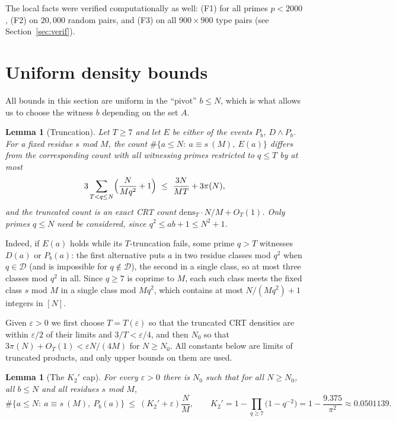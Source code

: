 \documentclass[11pt,a4paper]{article}
\theoremstyle{plain}
\newtheorem{lemma}[theorem]{Lemma}
\theoremstyle{definition}
\theoremstyle{remark}
\newcommand{\Dset}{\mathcal{D}}
\begin{document}
The local facts were verified computationally as well: (F1) for all primes $p<2000$, (F2) on $20{,}000$
random pairs, and (F3) on all $900\times 900$ type pairs (see Section~\ref{sec:verif}).

\section{Uniform density bounds}\label{sec:dens}

All bounds in this section are uniform in the ``pivot'' $b\le N$, which is what allows us to choose
the witness $b$ depending on the set $A$.

\begin{lemma}[Truncation]\label{lem:trunc}
Let $T\ge 7$ and let $E$ be either of the events $P_b$, $D\wedge P_b$. For a fixed residue $s$ mod $M$,
the count $\#\{a\le N:\ a\equiv s\ (M),\ E(a)\}$ differs from the corresponding count with all
witnessing primes restricted to $q\le T$ by at most
\[
 3\sum_{T<q\le N}\Bigl(\frac{N}{Mq^2}+1\Bigr)\ \le\ \frac{3N}{MT}+3\pi(N),
\]
and the truncated count is an exact CRT count $\mathrm{dens}_T\cdot N/M+O_T(1)$. Only primes $q\le N$
need be considered, since $q^2\le ab+1\le N^2+1$.
\end{lemma}

Indeed, if $E(a)$ holds while its $T$-truncation fails, some prime $q>T$ witnesses $D(a)$ or
$P_b(a)$: the first alternative puts $a$ in two residue classes mod $q^2$ when $q\in\Dset$ (and is
impossible for $q\notin\Dset$), the second in a single class, so at most three classes mod $q^2$ in
all. Since $q\ge 7$ is coprime to $M$, each such class meets the fixed class $s$ mod $M$ in a single
class mod $Mq^2$, which contains at most $N/(Mq^2)+1$ integers in $[N]$.

Given $\varepsilon>0$ we first choose $T=T(\varepsilon)$ so that the truncated CRT densities are within
$\varepsilon/2$ of their limits and $3/T<\varepsilon/4$, and then $N_0$ so that
$3\pi(N)+O_T(1)<\varepsilon N/(4M)$ for $N\ge N_0$. All constants below are limits of truncated products,
and only upper bounds on them are used.

\begin{lemma}[The $K_2'$ cap]\label{lem:K2}
For every $\varepsilon>0$ there is $N_0$ such that for all $N\ge N_0$, all $b\le N$ and all residues
$s$ mod $M$,
\[
 \#\{a\le N:\ a\equiv s\ (M),\ P_b(a)\}\ \le\ (K_2'+\varepsilon)\frac{N}{M},
 \qquad
 K_2'=1-\prod_{q\ge 7}\bigl(1-q^{-2}\bigr)=1-\frac{9.375}{\pi^2}\approx 0.0501139 .
\]
\end{lemma}
\end{document}
